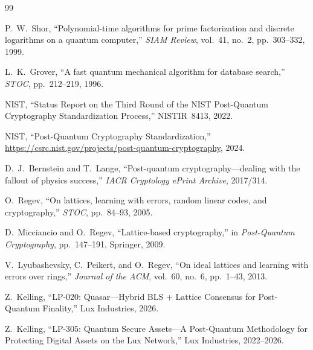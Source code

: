 
\begin{thebibliography}{99}

P.~W.~Shor, ``Polynomial-time algorithms for prime factorization and
discrete logarithms on a quantum computer,'' \textit{SIAM Review},
vol.~41, no.~2, pp.~303--332, 1999.

L.~K.~Grover, ``A fast quantum mechanical algorithm for database
search,'' \textit{STOC}, pp.~212--219, 1996.

NIST, ``Status Report on the Third Round of the NIST Post-Quantum
Cryptography Standardization Process,'' NISTIR~8413, 2022.

NIST, ``Post-Quantum Cryptography Standardization,''
\url{https://csrc.nist.gov/projects/post-quantum-cryptography}, 2024.

D.~J.~Bernstein and T.~Lange, ``Post-quantum cryptography---dealing
with the fallout of physics success,'' \textit{IACR Cryptology ePrint
Archive}, 2017/314.

O.~Regev, ``On lattices, learning with errors, random linear codes,
and cryptography,'' \textit{STOC}, pp.~84--93, 2005.

D.~Micciancio and O.~Regev, ``Lattice-based cryptography,'' in
\textit{Post-Quantum Cryptography}, pp.~147--191, Springer, 2009.

V.~Lyubashevsky, C.~Peikert, and O.~Regev, ``On ideal lattices and
learning with errors over rings,'' \textit{Journal of the ACM},
vol.~60, no.~6, pp.~1--43, 2013.

Z.~Kelling, ``LP-020: Quasar---Hybrid BLS + Lattice Consensus for
Post-Quantum Finality,'' Lux Industries, 2026.

Z.~Kelling, ``LP-305: Quantum Secure Assets---A Post-Quantum
Methodology for Protecting Digital Assets on the Lux Network,''
Lux Industries, 2022--2026.

\end{thebibliography}

